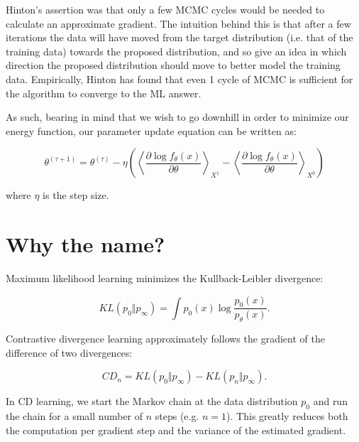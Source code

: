 \documentclass[11pt]{article}
\begin{document}
Hinton's assertion was that only a few MCMC cycles would be needed to calculate an approximate gradient. The intuition behind this is that after
a few iterations the data will have moved from the target distribution (i.e. that of the training data) towards the proposed distribution, and so give an idea in which direction the proposed distribution should move to better model the training data. Empirically, Hinton has found that even 1 cycle of MCMC is sufficient for the algorithm to converge to the ML answer. 

As such, bearing in mind that we wish to go downhill in order to minimize our energy function, our parameter update equation can be written as:

\begin{equation}
\theta^{(\tau+1)} = \theta^{(\tau)} - \eta \left( \left\langle \frac{\partial\log f_\theta(x)}{\partial\theta} \right\rangle_{X^1} - \left\langle \frac{\partial\log f_\theta (x)}{\partial\theta} \right\rangle_{X^0} \right)
\end{equation}

where $\eta$ is the step size.

\section{Why the name?}

Maximum likelihood learning minimizes the Kullback-Leibler divergence:

\begin{equation}
KL\left(p_0 \Vert p_\infty \right) = \int p_0(x) \log\frac{p_0(x)}{p_\theta(x)}.
\end{equation}

Contrastive divergence learning approximately follows the gradient of the difference of two divergences:

\begin{equation}
CD_n = KL\left(p_0 \Vert p_\infty \right) - KL\left(p_n \Vert p_\infty \right).
\end{equation}

In CD learning, we start the Markov chain at the data distribution $p_0$ and run the chain for a small number of $n$ steps (e.g. $n=1$). This greatly reduces both the computation per gradient step and the variance of the estimated gradient.


 
\end{document}
